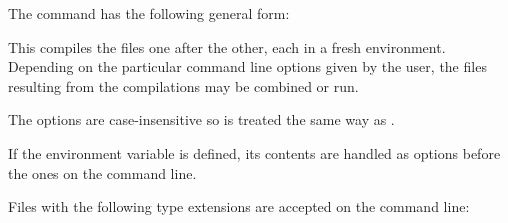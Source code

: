 %


The \asharpcmd{} command has the following general form:


This compiles the files one after the other,
each in a fresh environment.  Depending on the particular command line
options given by the user, the files
resulting from the compilations may be combined or run.

The options are case-insensitive so  is treated the same
way as .

If the environment variable  is defined, its
contents are handled as options before the ones on the command line.


Files with the following type extensions are accepted on the command line:

